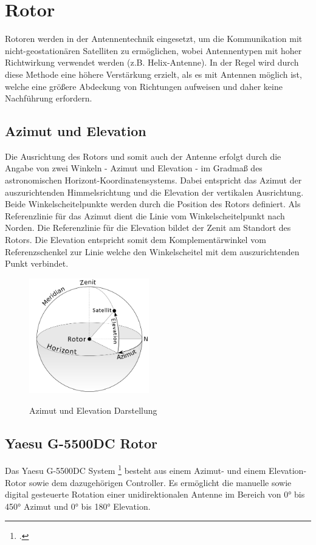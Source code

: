 \chapter{Rotor}
Rotoren werden in der Antennentechnik eingesetzt, um die Kommunikation mit nicht-geostationären Satelliten zu ermöglichen, wobei Antennentypen mit hoher Richtwirkung verwendet werden (z.B. Helix-Antenne). In der Regel wird durch diese Methode eine höhere Verstärkung erzielt, als es mit Antennen möglich ist, welche eine größere Abdeckung von Richtungen aufweisen und daher keine Nachführung erfordern. 
\section{Azimut und Elevation}
Die Ausrichtung des Rotors und somit auch der Antenne erfolgt durch die Angabe von zwei Winkeln - Azimut und Elevation - im Gradmaß des astronomischen Horizont-Koordinatensystems. Dabei entspricht das Azimut der auszurichtenden Himmelsrichtung und die Elevation der vertikalen Ausrichtung. Beide Winkelscheitelpunkte werden durch die Position des Rotors definiert. Als Referenzlinie für das Azimut dient die Linie vom Winkelscheitelpunkt nach Norden. Die Referenzlinie für die Elevation bildet der Zenit am Standort des Rotors. Die Elevation entspricht somit dem Komplementärwinkel vom Referenzschenkel zur Linie welche den Winkelscheitel mit dem auszurichtenden Punkt verbindet.

\begin{figure}[H]
	\centering
	\includegraphics[width=5.2cm]{../ref/Azimuth-Altitude_schematic_satellit.png}
	\label{fig:Azimut_Elevation_Schematic}
	\caption{Azimut und Elevation Darstellung}
\end{figure}

\section{Yaesu G-5500DC Rotor}
Das Yaesu G-5500DC System \footcite{noauthor_yaesu_nodate} besteht aus einem Azimut- und einem Elevation-Rotor sowie dem dazugehörigen Controller. Es ermöglicht die manuelle sowie digital gesteuerte Rotation einer unidirektionalen Antenne im Bereich von 0° bis 450° Azimut und 0° bis 180° Elevation.

